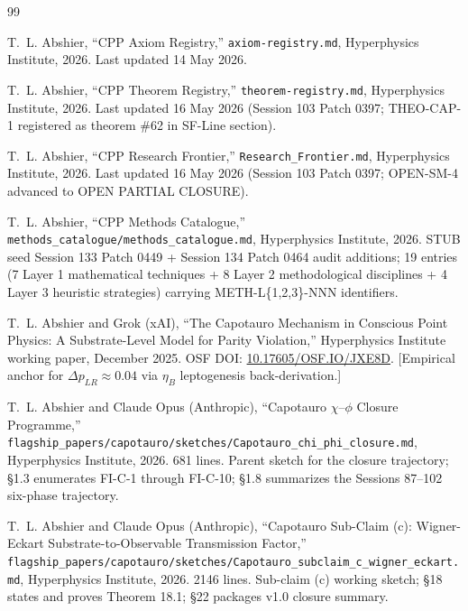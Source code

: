 \documentclass[11pt,letterpaper]{article}
\newcommand{\DeltapLR}{\Delta p_{LR}}
\begin{document}
\begin{thebibliography}{99}

 T.~L. Abshier, ``CPP Axiom Registry,'' \texttt{axiom-registry.md}, Hyperphysics Institute, 2026. Last updated 14 May 2026.

 T.~L. Abshier, ``CPP Theorem Registry,'' \texttt{theorem-registry.md}, Hyperphysics Institute, 2026. Last updated 16 May 2026 (Session 103 Patch 0397; THEO-CAP-1 registered as theorem \#62 in SF-Line section).

 T.~L. Abshier, ``CPP Research Frontier,'' \texttt{Research\_Frontier.md}, Hyperphysics Institute, 2026. Last updated 16 May 2026 (Session 103 Patch 0397; OPEN-SM-4 advanced to OPEN PARTIAL CLOSURE).

 T.~L. Abshier, ``CPP Methods Catalogue,'' \texttt{methods\_catalogue/methods\_catalogue.md}, Hyperphysics Institute, 2026. STUB seed Session 133 Patch 0449 + Session 134 Patch 0464 audit additions; 19 entries (7 Layer 1 mathematical techniques + 8 Layer 2 methodological disciplines + 4 Layer 3 heuristic strategies) carrying METH-L\{1,2,3\}-NNN identifiers.

 T.~L. Abshier and Grok (xAI), ``The Capotauro Mechanism in Conscious Point Physics: A Substrate-Level Model for Parity Violation,'' Hyperphysics Institute working paper, December 2025. OSF DOI: \href{https://doi.org/10.17605/OSF.IO/JXE8D}{10.17605/OSF.IO/JXE8D}. [Empirical anchor for $\DeltapLR \approx 0.04$ via $\eta_B$ leptogenesis back-derivation.]

 T.~L. Abshier and Claude Opus (Anthropic), ``Capotauro $\chi$--$\phi$ Closure Programme,'' \texttt{flagship\_papers/capotauro/sketches/Capotauro\_chi\_phi\_closure.md}, Hyperphysics Institute, 2026. 681 lines. Parent sketch for the closure trajectory; \S 1.3 enumerates FI-C-1 through FI-C-10; \S 1.8 summarizes the Sessions 87--102 six-phase trajectory.

 T.~L. Abshier and Claude Opus (Anthropic), ``Capotauro Sub-Claim (c): Wigner-Eckart Substrate-to-Observable Transmission Factor,'' \texttt{flagship\_papers/capotauro/sketches/Capotauro\_subclaim\_c\_wigner\_eckart.md}, Hyperphysics Institute, 2026. 2146 lines. Sub-claim (c) working sketch; \S 18 states and proves Theorem 18.1; \S 22 packages v1.0 closure summary.


\end{thebibliography}
\end{document}
